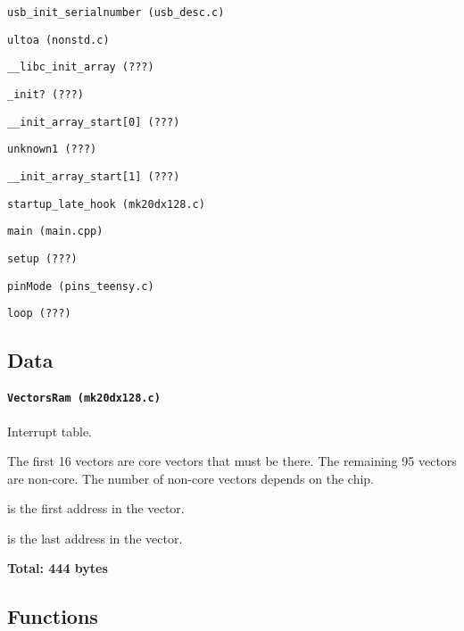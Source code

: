 \hspace{6mm} \texttt{usb\_init\_serialnumber (usb\_desc.c)}

\hspace{8mm} \texttt{ultoa (nonstd.c)}

\hspace{2mm} \texttt{\_\_libc\_init\_array (???)}

\hspace{4mm} \texttt{\_init? (???)}

\hspace{4mm} \texttt{\_\_init\_array\_start[0] (???)}

\hspace{6mm} \texttt{unknown1 (???)}

\hspace{4mm} \texttt{\_\_init\_array\_start[1] (???)}

\hspace{2mm} \texttt{startup\_late\_hook (mk20dx128.c)}

\hspace{2mm} \texttt{main (main.cpp)}

\hspace{4mm} \texttt{setup (???)}

\hspace{6mm} \texttt{pinMode (pins\_teensy.c)}

\hspace{4mm} \texttt{loop (???)}

\subsection{Data}

\paragraph{\texttt{VectorsRam (mk20dx128.c)}} Interrupt table.

The first 16 vectors are core vectors that must be there. The remaining 95
vectors are non-core. The number of non-core vectors depends on the chip.

 is the first address in the vector.

 is the last address in the vector.

\textbf{Total: 444 bytes}

\subsection{Functions}

